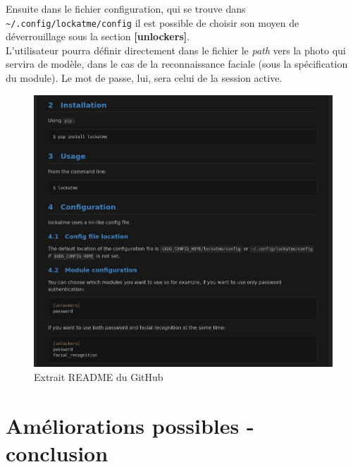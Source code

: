 \documentclass[french]{report}
\begin{document}
Ensuite dans le fichier configuration, qui se trouve dans \verb|~/.config/lockatme/config|
il est possible de choisir son moyen de déverrouillage sous la section \textbf{[unlockers]}.
\\
L'utilisateur pourra définir directement dans le fichier le \emph{path} vers la photo qui servira
de modèle, dans le cas de la reconnaissance faciale (sous la spécification du module). Le mot de passe, lui, sera celui de
la session active.

\begin{figure}[h]\label{fig:readme}
  \includegraphics[width=\linewidth]{readme}
  \caption{Extrait README du GitHub}
  \label{fig:readme}
\end{figure}


\chapter{Améliorations possibles - conclusion}

\newpage
\end{document}
